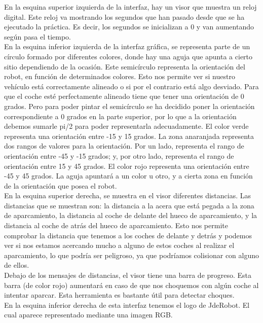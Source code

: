 En la esquina superior izquierda de la interfaz, hay un visor que muestra un reloj digital. Este reloj va mostrando los segundos que han pasado desde que se ha ejecutado la práctica. Es decir, los segundos se inicializan a 0 y van aumentando según pasa el tiempo.\\

En la esquina inferior izquierda de la interfaz gráfica, se representa parte de un círculo formado por diferentes colores, donde hay una aguja que apunta a cierto sitio dependiendo de la ocasión. Este semicírculo representa la orientación del robot, en función de determinados colores. Esto nos permite ver si nuestro vehículo está correctamente alineado o si por el contrario está algo desviado. Para que el coche esté perfectamente alineado tiene que tener una orientación de 0 grados. Pero para poder pintar el semicírculo se ha decidido poner la orientación correspondiente a 0 grados en la parte superior, por lo que a la orientación debemos sumarle pi/2 para poder representarla adecuadamente. El color verde representa una orientación entre -15 y 15 grados. La zona anaranjada representa dos rangos de valores para la orientación. Por un lado, representa el rango de orientación entre -45 y -15 grados; y, por otro lado, representa el rango de orientación entre 15 y 45 grados. El color rojo representa una orientación entre -45 y 45 grados. La aguja apuntará a un color u otro, y a cierta zona en función de la orientación que posea el robot.\\

En la esquina superior derecha, se muestra en el visor diferentes distancias. Las distancias que se muestran son: la distancia a la acera que está pegada a la zona de aparcamiento, la distancia al coche de delante del hueco de aparcamiento, y la distancia al coche de atrás del hueco de aparcamiento. Esto nos permite comprobar la distancia que tenemos a los coches de delante y detrás y podemos ver si nos estamos acercando mucho a alguno de estos coches al realizar el aparcamiento, lo que podría ser peligroso, ya que podríamos colisionar con alguno de ellos.\\

Debajo de los mensajes de distancias, el visor tiene una barra de progreso. Esta barra (de color rojo) aumentará en caso de que nos choquemos con algún coche al intentar aparcar. Esta herramienta es bastante útil para detectar choques. \\

En la esquina inferior derecha de esta interfaz tenemos el logo de JdeRobot. El cual aparece representado mediante una imagen RGB.\\

